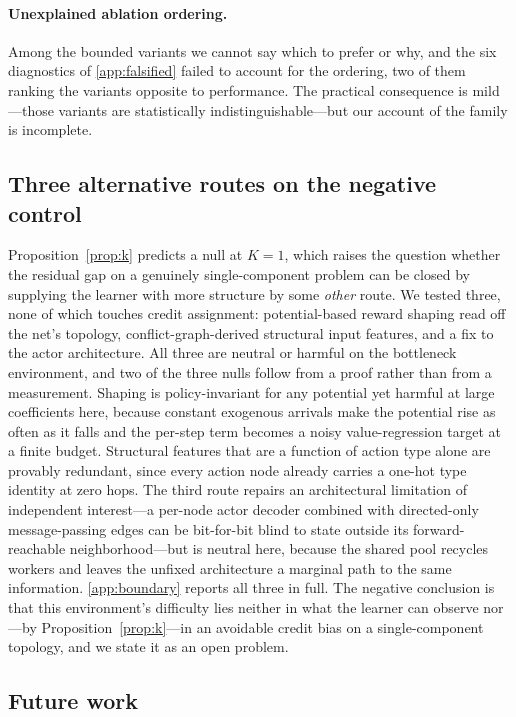 \documentclass[review,authoryear,3p,times]{elsarticle}
\begin{document}
\paragraph{Unexplained ablation ordering.} Among the bounded variants we cannot
say which to prefer or why, and the six diagnostics of
\ref{app:falsified} failed to account for the ordering, two of them
ranking the variants opposite to performance. The practical consequence is
mild---those variants are statistically indistinguishable---but our account of
the family is incomplete.

\subsection{Three alternative routes on the negative control}
\label{sec:boundary}

Proposition~\ref{prop:k} predicts a null at $K=1$, which raises the question
whether the residual gap on a genuinely single-component problem can be closed
by supplying the learner with more structure by some \emph{other} route. We
tested three, none of which touches credit assignment: potential-based reward
shaping read off the net's topology, conflict-graph-derived structural input
features, and a fix to the actor architecture. All three are neutral or harmful
on the bottleneck environment, and two of the three nulls follow from a proof
rather than from a measurement. Shaping is policy-invariant for any potential
\citep{ng1999shaping} yet harmful at large coefficients here, because constant
exogenous arrivals make the potential rise as often as it falls and the per-step
term becomes a noisy value-regression target at a finite budget. Structural
features that are a function of action type alone are provably redundant, since
every action node already carries a one-hot type identity at zero hops. The
third route repairs an architectural limitation of independent interest---a
per-node actor decoder combined with directed-only message-passing edges can be
bit-for-bit blind to state outside its forward-reachable neighborhood---but is
neutral here, because the shared pool recycles workers and leaves the unfixed
architecture a marginal path to the same information.
\ref{app:boundary} reports all three in full. The negative conclusion
is that this environment's difficulty lies neither in what the learner can
observe nor---by Proposition~\ref{prop:k}---in an avoidable credit bias on a
single-component topology, and we state it as an open problem.

\subsection{Future work}
\end{document}

